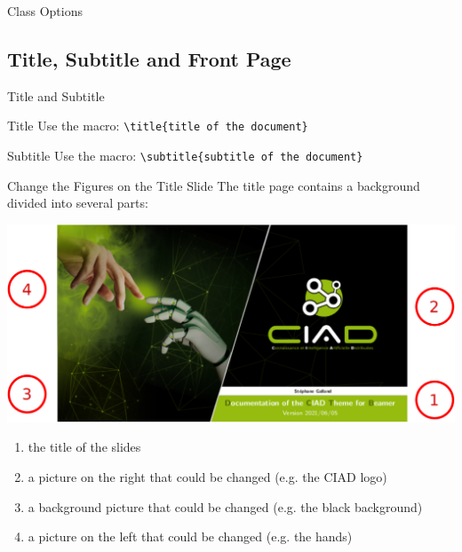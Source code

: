 \documentclass[english,sectioncirclenumberstyle]{ciadbeamer}
\begin{document}
\begin{frame}{Class Options \insertcontinuationtext}
\end{frame}

\subsection{Title, Subtitle and Front Page}

\begin{frame}{Title and Subtitle}
	\begin{block}{Title}
		Use the macro: \texttt{{\textbackslash}title\{title of the document\}}
	\end{block}
	\vfill
	\begin{block}{Subtitle}
		Use the macro: \texttt{{\textbackslash}subtitle\{subtitle of the document\}}
	\end{block}
	\vfill
\end{frame}

\begin{frame}[t]{{Change the Figures} on the Title Slide}
	The title page contains a background divided into several parts:
	\begin{center}
		\includegraphics[width=.5\linewidth]{frontpage}
	\end{center}
	\begin{enumerate}
		\item the title of the slides
		\item a picture on the right that could be changed (e.g. the CIAD logo)
		\item a background picture that could be changed (e.g. the black background)
		\item a picture on the left that could be changed (e.g. the hands)
	\end{enumerate}
\end{frame}
\end{document}

